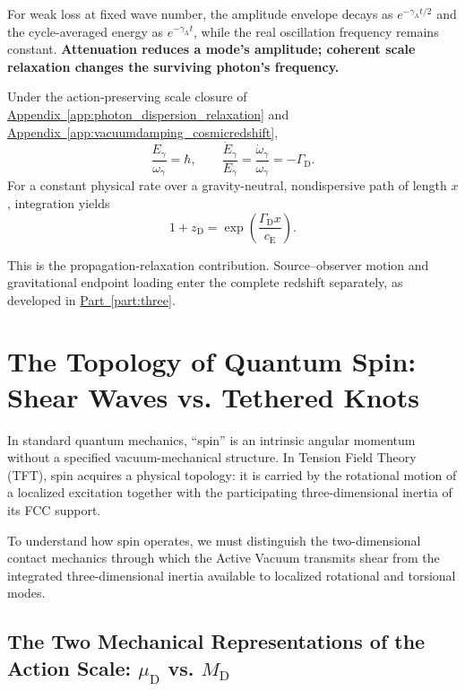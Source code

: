 For weak loss at fixed wave number, the amplitude envelope decays as $e^{-\gamma_{\mathrm A}t/2}$ and the cycle-averaged energy as $e^{-\gamma_{\mathrm A}t}$, while the real oscillation frequency remains constant. \textbf{Attenuation reduces a mode's amplitude; coherent scale relaxation changes the surviving photon's frequency.}

Under the action-preserving scale closure of \hyperref[app:photon_dispersion_relaxation]{Appendix~\ref*{app:photon_dispersion_relaxation}} and \hyperref[app:vacuumdamping_cosmicredshift]{Appendix~\ref*{app:vacuumdamping_cosmicredshift}},
\begin{equation}
    \frac{E_\gamma}{\omega_\gamma}=\hbar,
    \qquad
    \frac{\dot E_\gamma}{E_\gamma}
    =
    \frac{\dot\omega_\gamma}{\omega_\gamma}
    =
    -\Gamma_{\mathrm D}.
\end{equation}
For a constant physical rate over a gravity-neutral, nondispersive path of length $x$, integration yields
\begin{equation}
    1+z_{\mathrm D}
    =
    \exp\!\left(
        \frac{\Gamma_{\mathrm D}x}{c_{\mathrm E}}
    \right).
\end{equation}

This is the propagation-relaxation contribution. Source--observer motion and gravitational endpoint loading enter the complete redshift separately, as developed in \hyperref[part:three]{Part~\ref*{part:three}}.

\section{The Topology of Quantum Spin: Shear Waves vs. Tethered Knots}
\label{sec:quantum_spin}

In standard quantum mechanics, ``spin'' is an intrinsic angular momentum without a specified vacuum-mechanical structure. In Tension Field Theory (TFT), spin acquires a physical topology: it is carried by the rotational motion of a localized excitation together with the participating three-dimensional inertia of its FCC support.

To understand how spin operates, we must distinguish the two-dimensional contact mechanics through which the Active Vacuum transmits shear from the integrated three-dimensional inertia available to localized rotational and torsional modes.

\subsection{The Two Mechanical Representations of the Action Scale: $\mu_{\mathrm D}$ vs. $M_{\mathrm D}$}

